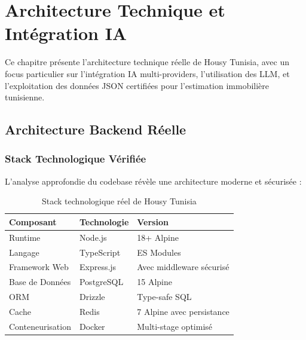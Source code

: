 
\chapter{Architecture Technique et Intégration IA}
\label{chap:architecture_ia}

\begin{objectivebox}
Ce chapitre présente l'architecture technique réelle de Housy Tunisia, avec un focus particulier sur l'intégration IA multi-providers, l'utilisation des LLM, et l'exploitation des données JSON certifiées pour l'estimation immobilière tunisienne.
\end{objectivebox}

\section{Architecture Backend Réelle}

\subsection{Stack Technologique Vérifiée}

L'analyse approfondie du codebase révèle une architecture moderne et sécurisée :

\begin{table}[H]
\centering
\caption{Stack technologique réel de Housy Tunisia}
\begin{tabular}{|l|l|l|}
\hline
\textbf{Composant} & \textbf{Technologie} & \textbf{Version} \\
\hline
Runtime & Node.js & 18+ Alpine \\
\hline
Langage & TypeScript & ES Modules \\
\hline
Framework Web & Express.js & Avec middleware sécurisé \\
\hline
Base de Données & PostgreSQL & 15 Alpine \\
\hline
ORM & Drizzle & Type-safe SQL \\
\hline
Cache & Redis & 7 Alpine avec persistance \\
\hline
Conteneurisation & Docker & Multi-stage optimisé \\
\hline
\end{tabular}
\end{table}

